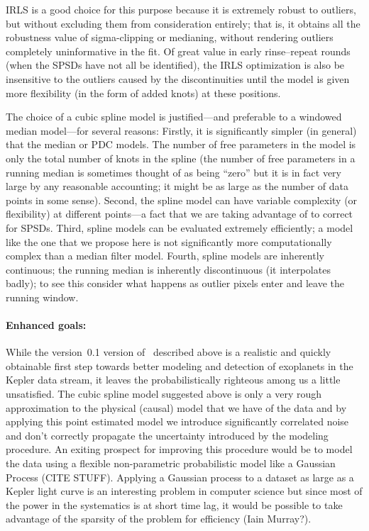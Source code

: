 \documentclass[letterpaper,12pt,preprint]{hack_aastex}
\newcommand{\Untrendy}{\package{Untrendy}}
\begin{document}
IRLS is a good choice for this purpose because it is extremely robust to
outliers, but without excluding them from consideration entirely; that is, it
obtains all the robustness value of sigma-clipping or medianing, without
rendering outliers completely uninformative in the fit.
Of great value in early rinse--repeat rounds (when the SPSDs have not all be identified),
the IRLS optimization is also be insensitive to the outliers caused by the
discontinuities until the model is given more flexibility (in the form of
added knots) at these positions.

The choice of a cubic spline model is
justified---and preferable to a windowed median model---for several reasons:
Firstly, it is significantly simpler (in general) that the median or PDC models.
The number of free parameters in the model is only the total number of knots
in the spline (the number of free parameters in a running median is sometimes
thought of as being ``zero'' but it is in fact very large by any reasonable
accounting; it might be as large as the number of data points in some sense).
Second, the spline model can have variable complexity (or flexibility) at
different points---a fact that we are taking advantage of to correct for
SPSDs.
Third, spline models can be evaluated extremely efficiently; a model
like the one that we propose here is not significantly more computationally
complex than a median filter model.
Fourth, spline models are inherently continuous; the running median is
inherently discontinuous (it interpolates badly); to see this consider what
happens as outlier pixels enter and leave the running window.

\paragraph{Enhanced goals:}
While the version~0.1 version of \Untrendy\ described above is a realistic and
quickly obtainable first step towards better modeling and detection of
exoplanets in the Kepler data stream, it leaves the probabilistically
righteous among us a little unsatisfied.
The cubic spline model suggested above is only a very rough approximation to
the physical (causal) model that we have of the data and by applying this
point estimated model we introduce significantly correlated noise and don't
correctly propagate the uncertainty introduced by the modeling procedure.
An exiting prospect for improving this procedure would be to model the data
using a flexible non-parametric probabilistic model like a Gaussian Process
 (CITE STUFF).
Applying a Gaussian process to a dataset as large as a Kepler light curve is
an interesting problem in computer science but since most of the power in the
systematics is at short time lag, it would be possible to take advantage of
the sparsity of the problem for efficiency (Iain Murray?).
\end{document}
